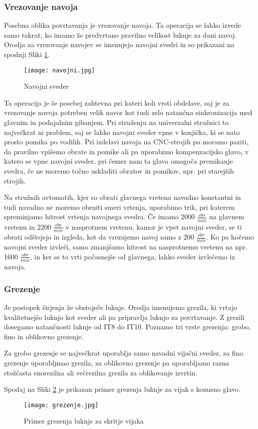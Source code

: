 \subsubsection{Vrezovanje navoja}
Posebna oblika povrtavanja je vrezovanje navoja. Ta operacija se
lahko izvede samo takrat, ko imamo že predvrtano pravilno
velikost luknje za dani navoj. Orodja za vrezovanje navojev se
imenujejo navojni svedri in so prikazani na spodnji Sliki \ref{navojni_sveder}.
\begin{figure}[H]
	\begin{center}
		\texttt{[image: navojni.jpg]}
		\caption{Navojni sveder
			\cite{sts_arhiv}}
		\label{navojni_sveder}
	\end{center}
\end{figure}
Ta operacija je še posebej zahtevna pri kateri koli vrsti obdelave,
saj je za vrezovanje navoja potreben velik navor kot tudi zelo natančna
sinhronizacija med glavnim in podajalnim gibanjem. Pri struženju
na univerzalni stružnici to največkrat ni problem, saj se lahko navojni
sveder vpne v konjička, ki se nato prosto pomika po vodilih.
Pri izdelavi navoja na CNC-strojih pa moramo paziti, da pravilno vpišemo
obrate in pomike ali pa uporabimo kompenzacijsko glavo, v katero se
vpne navojni sveder, pri čemer nam ta glava omogoča premikanje svedra, če
ne moremo točno uskladiti obratov in pomikov, npr. pri starejših
strojih.

Na stružnih avtomatih, kjer so obrati glavnega vretena navadno konstantni
in tudi navadno ne moremo obrniti smeri vrtenja, uporabimo trik, pri katerem
spreminjamo hitrost vrtenja navojnega svedra. Če imamo 2000 \(\frac{obr}{min}\)
na glavnem vretenu in 2200 \(\frac{obr}{min}\) v nasprotnem vretenu, kamor je
vpet navojni sveder, se ti obrati odštejejo in izgleda, kot da vrezujemo
navoj samo z 200 \(\frac{obr}{min}\). Ko pa hočemo navojni sveder izvleči, samo
zmanjšamo hitrost na nasprotnemu vretenu na npr. 1600 \(\frac{obr}{min}\),
in ker se to vrti počasnejše od glavnega, lahko sveder izvlečemo iz navoja.

\subsubsection{Grezenje}
Je postopek širjenja že obstoječe luknje. Orodja imenujemo grezila,
ki vrtajo kvalitetnejšo luknjo kot sveder ali pa pripravlja
luknjo za povrtavanje. Z grezili dosegamo natančnosti luknje od
IT8 do IT10. Poznamo tri vrste grezenja: grobo, fino in oblikovno grezenje.

Za grobo grezenje se največkrat uporablja samo navadni vijačni
sveder, za fino grezenje uporabljmao grezila, za oblikovno grezenje
pa uporabljamo razna stožčasta enorezilna ali večrezilna grezila
za oblikovanje izvrtin.

Spodaj na Sliki \ref{grezilo} je prikazan primer grezenja
luknje za vijak s konusno glavo.

\begin{figure}[H]
	\begin{center}
		\texttt{[image: grezenje.jpg]}
		\caption{Primer grezenja luknje za skritje vijaka
			\cite{sts_arhiv_grezenje}}
		\label{grezilo}
	\end{center}
\end{figure}